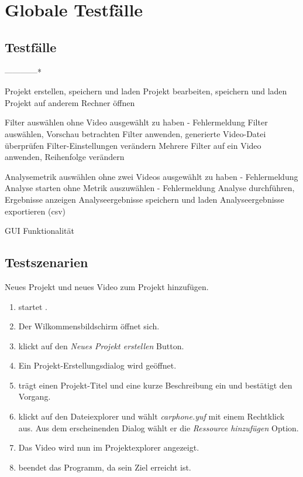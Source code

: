 \chapter{Globale Testfälle}
\section{Testfälle}
\setcounter{counterKriterien}{0}

------------*

 Projekt erstellen, speichern und laden
 Projekt bearbeiten, speichern und laden
 Projekt auf anderem Rechner öffnen

 Filter auswählen ohne Video ausgewählt zu haben - Fehlermeldung
 Filter auswählen, Vorschau betrachten
 Filter anwenden, generierte Video-Datei überprüfen
 Filter-Einstellungen verändern
 Mehrere Filter auf ein Video anwenden, Reihenfolge verändern

 Analysemetrik auswählen ohne zwei Videos ausgewählt zu haben - Fehlermeldung
 Analyse starten ohne Metrik auszuwählen - Fehlermeldung
 Analyse durchführen, Ergebnisse anzeigen
 Analyseergebnisse speichern und laden
 Analyseergebnisse exportieren (csv)

 GUI Funktionalität




\section{Testszenarien}
\setcounter{counterKriterien}{0}


 Neues Projekt und neues Video zum Projekt hinzufügen.\\
\begin{enumerate}
\item \dAU startet \projektTitel.
\item Der Wilkommensbildschirm öffnet sich.
\item \dAU klickt auf den \emph{Neues Projekt erstellen} Button.
\item Ein Projekt-Erstellungsdialog wird geöffnet.
\item \dAU trägt einen Projekt-Titel und eine kurze Beschreibung ein und bestätigt den Vorgang.
\item \dAU klickt auf den Dateiexplorer und wählt \emph{carphone.yuf} mit einem Rechtklick aus. Aus dem erscheinenden Dialog wählt er die \emph{Ressource hinzufügen} Option.
\item Das Video wird nun im Projektexplorer angezeigt.
\item \dAU beendet das Programm, da sein Ziel erreicht ist.
\end{enumerate}


